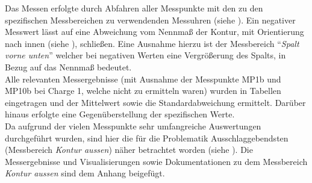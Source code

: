 \documentclass[12pt,a4paper,parskip,twoside,BCOR5mm,headsepline]{scrartcl}
\begin{document}
 
 
 
Das Messen erfolgte durch Abfahren aller Messpunkte mit den zu den spezifischen Messbereichen zu verwendenden Messuhren (siehe ). Ein negativer Messwert lässt auf eine Abweichung vom Nennmaß der Kontur, mit Orientierung nach innen (siehe ), schließen. Eine Ausnahme hierzu ist der Messbereich "`\emph{Spalt vorne unten}"' welcher  bei negativen Werten eine Vergrößerung des Spalts, in Bezug auf das Nennmaß bedeutet.\\
 Alle relevanten Messergebnisse (mit Ausnahme der Messpunkte MP1b und MP10b bei Charge 1, welche nicht zu ermitteln waren) wurden in Tabellen eingetragen und  der Mittelwert sowie die Standardabweichung
 ermittelt. Darüber hinaus erfolgte eine Gegenüberstellung der spezifischen Werte.\\
Da aufgrund der vielen Messpunkte  sehr umfangreiche Auswertungen durchgeführt wurden,  sind hier die für die Problematik Ausschlaggebendsten  (Messbereich \emph{Kontur aussen}) näher betrachtet worden (siehe ). Die Messergebnisse und Visualisierungen sowie Dokumentationen zu dem Messbereich \emph{Kontur aussen} sind dem Anhang beigefügt. 
\end{document}
